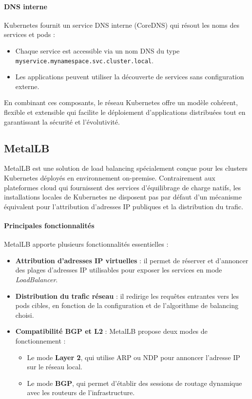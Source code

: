 \paragraph{DNS interne}

Kubernetes fournit un service DNS interne (CoreDNS) qui résout les noms des services et pods :
\begin{itemize}
	\item Chaque service est accessible via un nom DNS du type \texttt{myservice.mynamespace.svc.cluster.local}.
	\item Les applications peuvent utiliser la découverte de services sans configuration externe.
\end{itemize}

En combinant ces composants, le réseau Kubernetes offre un modèle cohérent, flexible et extensible qui facilite le déploiement d’applications distribuées tout en garantissant la sécurité et l’évolutivité.

\subsection{MetalLB}

MetalLB est une solution de load balancing spécialement conçue pour les clusters Kubernetes déployés en environnement on-premise. Contrairement aux plateformes cloud qui fournissent des services d’équilibrage de charge natifs, les installations locales de Kubernetes ne disposent pas par défaut d’un mécanisme équivalent pour l’attribution d’adresses IP publiques et la distribution du trafic.

\paragraph{Principales fonctionnalités}

MetalLB apporte plusieurs fonctionnalités essentielles :
\begin{itemize}
	\item \textbf{Attribution d’adresses IP virtuelles} : il permet de réserver et d’annoncer des plages d’adresses IP utilisables pour exposer les services en mode \emph{LoadBalancer}.
	\item \textbf{Distribution du trafic réseau} : il redirige les requêtes entrantes vers les pods cibles, en fonction de la configuration et de l’algorithme de balancing choisi.
	\item \textbf{Compatibilité BGP et L2} : MetalLB propose deux modes de fonctionnement :
	      \begin{itemize}
		      \item Le mode \textbf{Layer 2}, qui utilise ARP ou NDP pour annoncer l’adresse IP sur le réseau local.
		      \item Le mode \textbf{BGP}, qui permet d’établir des sessions de routage dynamique avec les routeurs de l’infrastructure.
	      \end{itemize}
\end{itemize}

